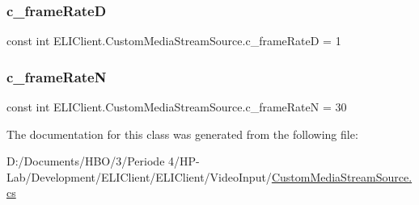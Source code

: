 \subsubsection{\texorpdfstring{c\+\_\+frame\+RateD}{c\_frameRateD}}
{\footnotesize\ttfamily const int E\+L\+I\+Client.\+Custom\+Media\+Stream\+Source.\+c\+\_\+frame\+RateD = 1\hspace{0.3cm}{\ttfamily [private]}}

\mbox{\label{class_e_l_i_client_1_1_custom_media_stream_source_ab060659fb19df455b86d5bd6fe5bf691}} 
\subsubsection{\texorpdfstring{c\+\_\+frame\+RateN}{c\_frameRateN}}
{\footnotesize\ttfamily const int E\+L\+I\+Client.\+Custom\+Media\+Stream\+Source.\+c\+\_\+frame\+RateN = 30\hspace{0.3cm}{\ttfamily [private]}}



The documentation for this class was generated from the following file\+:\begin{DoxyCompactItemize}
\item 
D\+:/\+Documents/\+H\+B\+O/3/\+Periode 4/\+H\+P-\/\+Lab/\+Development/\+E\+L\+I\+Client/\+E\+L\+I\+Client/\+Video\+Input/\hyperlink{_custom_media_stream_source_8cs}{Custom\+Media\+Stream\+Source.\+cs}\end{DoxyCompactItemize}
